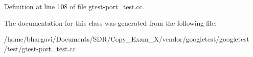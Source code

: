 Definition at line 108 of file gtest-\/port\+\_\+test.\+cc.



The documentation for this class was generated from the following file\+:\begin{DoxyCompactItemize}
\item 
/home/bhargavi/\+Documents/\+S\+D\+R/\+Copy\+\_\+\+Exam\+\_\+X/vendor/googletest/googletest/test/\hyperlink{gtest-port__test_8cc}{gtest-\/port\+\_\+test.\+cc}\end{DoxyCompactItemize}
